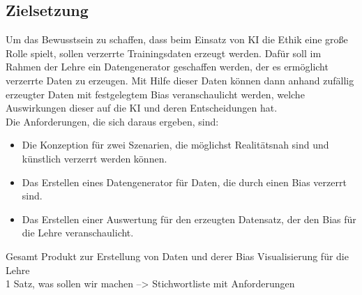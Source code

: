 \begin{onehalfspace}
        \section{Zielsetzung}
        \label{subsec:zielsetzung}
        Um das Bewusstsein zu schaffen, dass beim Einsatz von \ac*{KI} die Ethik eine große Rolle spielt, sollen verzerrte Trainingsdaten erzeugt werden. Dafür soll im Rahmen der Lehre ein Datengenerator geschaffen werden, der es ermöglicht verzerrte Daten zu erzeugen. Mit Hilfe dieser Daten können dann anhand zufällig erzeugter Daten mit festgelegtem Bias veranschaulicht werden, welche Auswirkungen dieser auf die \ac*{KI} und deren Entscheidungen hat. 
        \\
        Die Anforderungen, die sich daraus ergeben, sind:
        \begin{itemize}
            \item Die Konzeption für zwei Szenarien, die möglichst Realitätsnah sind und künstlich verzerrt werden können.
            \item Das Erstellen eines Datengenerator für Daten, die durch einen Bias verzerrt sind.
            \item Das Erstellen einer Auswertung für den erzeugten Datensatz, der den Bias für die Lehre veranschaulicht.
        \end{itemize} 
        Gesamt Produkt zur Erstellung von Daten und derer Bias Visualisierung für die Lehre \\
        1 Satz, was sollen wir machen --> Stichwortliste mit Anforderungen \\


\end{onehalfspace}
